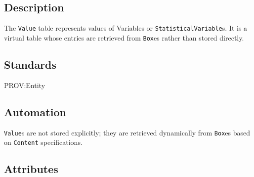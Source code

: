 \documentclass[
]{article}
\begin{document}
\subsection{Description}\label{description-37}

The \texttt{Value} table represents values of Variables or
\texttt{StatisticalVariable}s. It is a virtual table whose entries are
retrieved from \texttt{Box}es rather than stored directly.

\subsection{Standards}\label{standards-39}

PROV:Entity

\subsection{Automation}\label{automation-39}

\texttt{Value}s are not stored explicitly; they are retrieved
dynamically from \texttt{Box}es based on \texttt{Content}
specifications.

\subsection{Attributes}\label{attributes-33}
\end{document}
